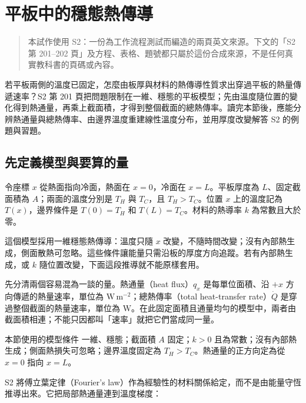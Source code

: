 \setcounter{section}{6}
\section{平板中的穩態熱傳導}
\label{sec:ch7-slab}

\begin{quote}\small
本試作使用 S2：一份為工作流程測試而編造的兩頁英文來源。下文的「S2 第 201–202 頁」及方程、表格、題號都只屬於這份合成來源，不是任何真實教科書的頁碼或內容。
\end{quote}

若平板兩側的溫度已固定，怎麼由板厚與材料的熱傳導性質求出穿過平板的熱量傳遞速率？S2 第 201 頁把問題限制在一維、穩態的平板模型；先由溫度隨位置的變化得到熱通量，再乘上截面積，才得到整個截面的總熱傳率。讀完本節後，應能分辨熱通量與總熱傳率、由邊界溫度重建線性溫度分布，並用厚度改變解答 S2 的例題與習題。

\subsection{先定義模型與要算的量}

令座標 \(x\) 從熱面指向冷面，熱面在 \(x=0\)，冷面在 \(x=L\)。平板厚度為 \(L\)、固定截面積為 \(A\)；兩面的溫度分別是 \(T_H\) 與 \(T_C\)，且 \(T_H>T_C\)。位置 \(x\) 上的溫度記為 \(T(x)\)，邊界條件是 \(T(0)=T_H\) 和 \(T(L)=T_C\)。材料的熱導率 \(k\) 為常數且大於零。

這個模型採用一維穩態熱傳導：溫度只隨 \(x\) 改變，不隨時間改變；沒有內部熱生成，側面散熱可忽略。這些條件讓能量只需沿板的厚度方向追蹤。若有內部熱生成，或 \(k\) 隨位置改變，下面這段推導就不能原樣套用。

先分清兩個容易混為一談的量。熱通量（heat flux）\(q_x\) 是每單位面積、沿 \(+x\) 方向傳遞的熱量速率，單位為 \(\mathrm{W\,m^{-2}}\)；總熱傳率（total heat-transfer rate）\(\dot Q\) 是穿過整個截面的熱量速率，單位為 \(\mathrm W\)。在此固定面積且通量均勻的模型中，兩者由截面積相連；不能只因都叫「速率」就把它們當成同一量。

\begin{principle}{本節使用的模型條件}
一維、穩態；截面積 \(A\) 固定；\(k>0\) 且為常數；沒有內部熱生成；側面熱損失可忽略；邊界溫度固定為 \(T_H>T_C\)。熱通量的正方向定為從 \(x=0\) 指向 \(x=L\)。
\end{principle}

S2 將傅立葉定律（Fourier's law）作為經驗性的材料關係給定，而不是由能量守恆推導出來。它把局部熱通量連到溫度梯度：



